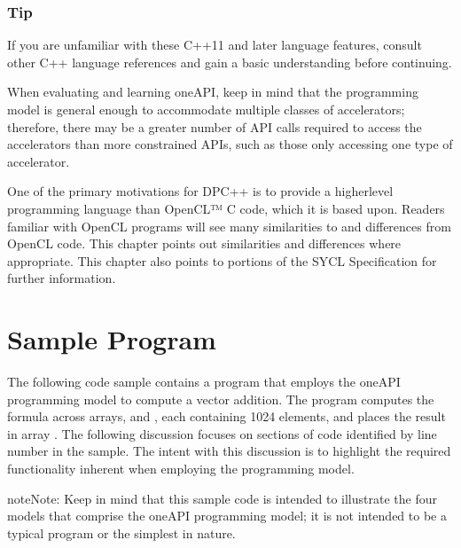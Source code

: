 \documentclass[letterpaper,10pt,english]{sphinxmanual}
\begin{document}
\subsubsection*{Tip}

If you are unfamiliar with these C++11 and later language features,
consult other C++ language references and gain a basic understanding
before continuing.

When evaluating and learning oneAPI, keep in mind that the programming
model is general enough to accommodate multiple classes of accelerators;
therefore, there may be a greater number of API calls required to access
the accelerators than more constrained APIs, such as those only
accessing one type of accelerator.

One of the primary motivations for DPC++ is to provide a higher\sphinxhyphen{}level
programming language than OpenCL™ C code, which it is based upon.
Readers familiar with OpenCL programs will see many similarities to and
differences from OpenCL code. This chapter points out similarities and
differences where appropriate. This chapter also points to portions of
the SYCL Specification for further information.


\section{Sample Program}
\label{\detokenize{programming-model/sample-program:sample-program}}\label{\detokenize{programming-model/sample-program:id1}}\label{\detokenize{programming-model/sample-program::doc}}
The following code sample contains a program that employs the oneAPI
programming model to compute a vector addition. The program computes the
formula  across arrays,  and , each containing
1024 elements, and places the result in array . The following
discussion focuses on sections of code identified by line number in the
sample. The intent with this discussion is to highlight the required
functionality inherent when employing the programming model.

\begin{sphinxadmonition}{note}{Note:}
Keep in mind that this sample code is intended to illustrate the four
models that comprise the oneAPI programming model; it is not intended
to be a typical program or the simplest in nature.
\end{sphinxadmonition}
\end{document}
